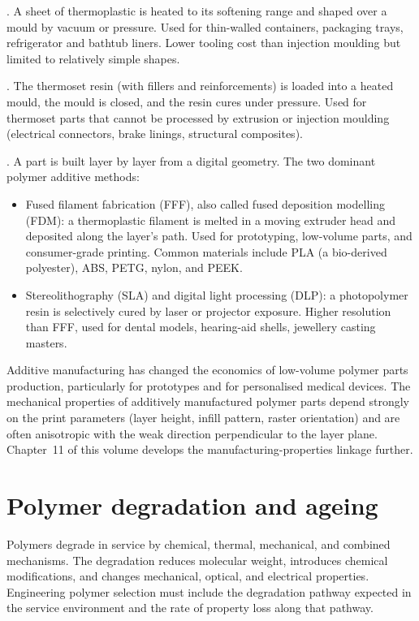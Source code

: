 . A sheet of thermoplastic is heated to its
softening range and shaped over a mould by vacuum or pressure. Used
for thin-walled containers, packaging trays, refrigerator and bathtub
liners. Lower tooling cost than injection moulding but limited to
relatively simple shapes.

. The thermoset resin (with
fillers and reinforcements) is loaded into a heated mould, the mould
is closed, and the resin cures under pressure. Used for thermoset
parts that cannot be processed by extrusion or injection moulding
(electrical connectors, brake linings, structural composites).

. A part is built layer
by layer from a digital geometry. The two dominant polymer additive
methods:

\begin{itemize}[leftmargin=*]
\item Fused filament fabrication (FFF), also called fused deposition
  modelling (FDM): a thermoplastic filament is melted in a moving
  extruder head and deposited along the layer's path. Used for
  prototyping, low-volume parts, and consumer-grade printing. Common
  materials include PLA (a bio-derived polyester), ABS, PETG, nylon,
  and PEEK.
\item Stereolithography (SLA) and digital light processing (DLP): a
  photopolymer resin is selectively cured by laser or projector
  exposure. Higher resolution than FFF, used for dental models,
  hearing-aid shells, jewellery casting masters.
\end{itemize}

Additive manufacturing has changed the economics of low-volume polymer
parts production, particularly for prototypes and for personalised
medical devices. The mechanical properties of additively manufactured
polymer parts depend strongly on the print parameters (layer height,
infill pattern, raster orientation) and are often anisotropic with the
weak direction perpendicular to the layer plane. Chapter~11 of this
volume develops the manufacturing-properties linkage further.

\section{Polymer degradation and ageing}

Polymers degrade in service by chemical, thermal, mechanical, and
combined mechanisms. The degradation reduces molecular weight,
introduces chemical modifications, and changes mechanical, optical,
and electrical properties. Engineering polymer selection must
include the degradation pathway expected in the service environment
and the rate of property loss along that pathway.

